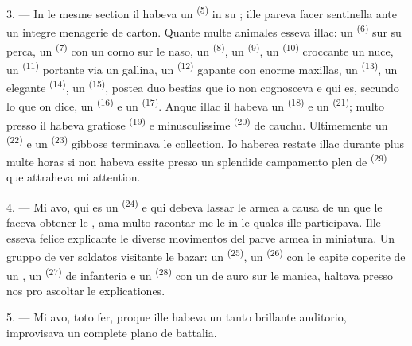 3. --- In le mesme section il habeva un 
\textsuperscript{(5)} in su ; ille pareva facer sentinella ante un
integre menagerie de carton. Quante multe animales esseva illac: un
 \textsuperscript{(6)} sur su perca, un 
\textsuperscript{(7)} con un corno sur le naso, un 
\textsuperscript{(8)}, un  \textsuperscript{(9)}, un
 \textsuperscript{(10)} croccante un nuce, un 
\textsuperscript{(11)} portante via un gallina, un 
\textsuperscript{(12)} gapante con enorme maxillas, un 
\textsuperscript{(13)}, un elegante  \textsuperscript{(14)},
un  \textsuperscript{(15)}, postea duo bestias que io non
cognosceva e qui es, secundo lo que on dice, un 
\textsuperscript{(16)} e un  \textsuperscript{(17)}. Anque illac
il habeva un  \textsuperscript{(18)} e un 
\textsuperscript{(21)}; multo presso il habeva gratiose 
\textsuperscript{(19)} e minusculissime  \textsuperscript{(20)} de
cauchu. Ultimemente un  \textsuperscript{(22)} e un
 \textsuperscript{(23)} gibbose terminava le collection. Io
haberea restate illac durante plus multe horas si non habeva essite presso un
splendide campamento plen de  \textsuperscript{(29)}
que attraheva mi attention.

\VUsaut{4.0mm}
\VUsaut{2.8mm}

4. --- Mi avo, qui es un  \textsuperscript{(24)} e qui debeva
lassar le armea a causa de un  que le faceva obtener le
, ama multo racontar me le  in le
quales ille participava. Ille esseva felice explicante le diverse movimentos del
parve armea in miniatura. Un gruppo de ver soldatos visitante le bazar: un
 \textsuperscript{(25)}, un 
\textsuperscript{(26)} con le capite coperite de un , un
 \textsuperscript{(27)} de infanteria e un
 \textsuperscript{(28)} con un  de
auro sur le manica, haltava presso nos pro ascoltar le explicationes.

5. --- Mi avo, toto fer, proque ille habeva un tanto brillante auditorio,
improvisava un complete plano de battalia.


